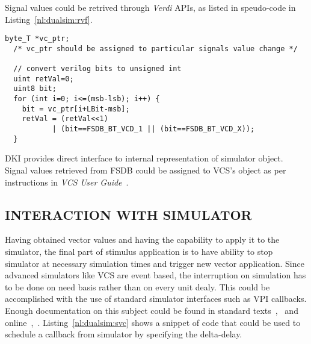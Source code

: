 
Signal values could be retrived through {\it Verdi} APIs, as listed in speudo-code in Listing~\ref{nl:dualsim:rvf}.

\lstset{language=C++,
basicstyle=\footnotesize,
frame=shadowbox,
breaklines=true}          
\begin{lstlisting}[frame=single, caption=Retrieving Values from FSDB,label=nl:dualsim:rvf] 
  byte_T *vc_ptr;
  /* vc_ptr should be assigned to particular signals value change */

  // convert verilog bits to unsigned int
  uint retVal=0;
  uint8 bit;
  for (int i=0; i<=(msb-lsb); i++) {
    bit = vc_ptr[i+LBit-msb];
    retVal = (retVal<<1)
           | (bit==FSDB_BT_VCD_1 || (bit==FSDB_BT_VCD_X));
  }
\end{lstlisting}
\renewcommand{\lstlistingname}{Code}

DKI provides direct interface to internal representation of simulator object. Signal values retrieved from FSDB could be assigned to VCS's object as per instructions in {\it VCS User Guide}~\citep[Section~C~Language~Interface$>$~Direct~C]{VCS:vcs.pdf}.

\subsection{INTERACTION WITH SIMULATOR}
Having obtained vector values and having the capability to apply it to the simulator, the final part of stimulus application is to have ability to stop simulator at necessary simulation times and trigger new vector application. Since advanced simulators like VCS are event based, the interruption on simulation  has to be done on need basis rather than on every unit dealy. This could be accomplished with the use of standard simulator interfaces such as VPI callbacks. Enough documentation on this subject could be found in standard texts~\citep{ss:pli:1999},~\citep{sm:pli:1999} and online~\citep{wiki:2013:VPI},~\citep{aw:2013:VPI}. Listing~\ref{nl:dualsim:svc} shows a snippet of code that could be used to schedule a callback from simulator by specifying the delta-delay.

